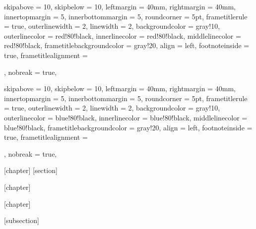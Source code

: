 {
skipabove         = 10,
skipbelow         = 10,
leftmargin        = 40mm,
rightmargin       = 40mm,
innertopmargin    = 5,
innerbottommargin = 5,
%
roundcorner =  5pt,
frametitlerule = true,
%
outerlinewidth  =  2,
linewidth = 2,
%
backgroundcolor = gray!10,
outerlinecolor  = red!80!black,
innerlinecolor  = red!80!black,
middlelinecolor = red!80!black,
frametitlebackgroundcolor = gray!20,
%
align = left,
footnoteinside = true,
frametitlealignment = \raggedright,
nobreak = true,
}


{
skipabove         = 10,
skipbelow         = 10,
leftmargin        = 40mm,
rightmargin       = 40mm,
innertopmargin    = 5,
innerbottommargin = 5,
%
roundcorner =  5pt,
frametitlerule = true,
%
outerlinewidth  =  2,
linewidth = 2,
%
backgroundcolor = gray!10,
outerlinecolor  = blue!80!black,
innerlinecolor  = blue!80!black,
middlelinecolor = blue!80!black,
frametitlebackgroundcolor = gray!20,
%
align = left,
footnoteinside = true,
frametitlealignment = \raggedright,
nobreak = true,
}

[chapter]
[section]





[chapter]

[chapter]

[subsection]

